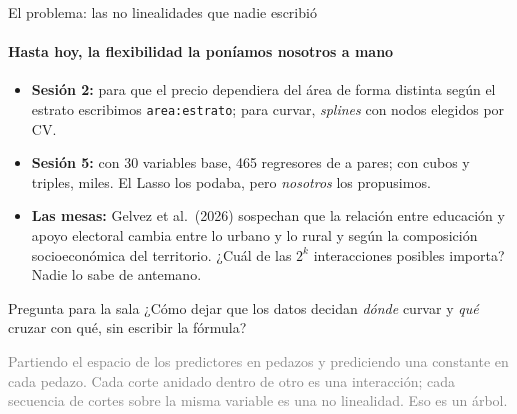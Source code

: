 \documentclass{beamer}
\newcommand{\1}{\mathbb{I}}
\begin{document}
\begin{frame}{El problema: las no linealidades que nadie escribió}
\framesubtitle{Hasta hoy, la flexibilidad la poníamos nosotros a mano}
\small
\begin{itemize}\itemsep4pt
  \item \textbf{Sesión 2:} para que el precio dependiera del área de forma distinta según el estrato escribimos \texttt{area:estrato}; para curvar, \emph{splines} con nodos elegidos por CV. \pause
  \item \textbf{Sesión 5:} con 30 variables base, 465 regresores de a pares; con cubos y triples, miles. El Lasso los podaba, pero \emph{nosotros} los propusimos. \pause
  \item \textbf{Las mesas:} Gelvez et al.\ (2026) sospechan que la relación entre educación y apoyo electoral cambia entre lo urbano y lo rural y según la composición socioeconómica del territorio. ¿Cuál de las $2^k$ interacciones posibles importa? Nadie lo sabe de antemano.
\end{itemize}
\pause
\vspace{0.1cm}
\begin{block}{Pregunta para la sala}
¿Cómo dejar que los datos decidan \emph{dónde} curvar y \emph{qué} cruzar con qué, sin escribir la fórmula?
\end{block}
\pause
\textcolor{gray}{Partiendo el espacio de los predictores en pedazos y prediciendo una constante en cada pedazo. Cada corte anidado dentro de otro es una interacción; cada secuencia de cortes sobre la misma variable es una no linealidad. Eso es un árbol.}
\end{frame}
\end{document}
